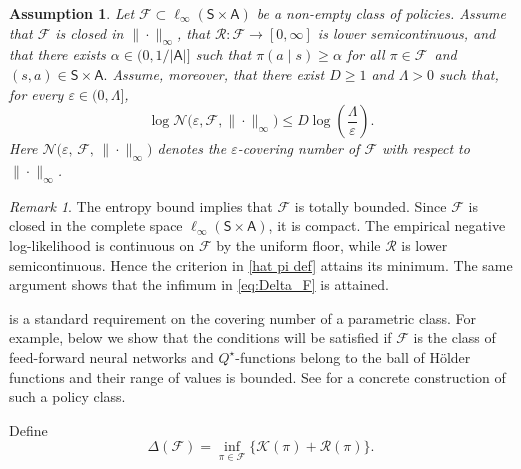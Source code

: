 \documentclass{article}
\theoremstyle{definition}
\theoremstyle{remark}
\newtheorem{remark}[proposition]{Remark}
\theoremstyle{plain}
\newtheorem{assumption}[proposition]{Assumption}
\numberwithin{equation}{section}
\begin{document}
\begin{assumption}
    \label{assum: F}
Let \(\mathcal F\subset \ell_\infty(\mathsf S\times\mathsf A)\) be a non-empty class of policies. Assume that \(\mathcal F\) is
closed in \(\|\cdot\|_\infty\), that
\(\mathcal R:\mathcal F\to[0,\infty]\) is lower semicontinuous, and that
there exists \(\alpha\in(0,1/|\mathsf A|]\) such that
\(
    \pi(a\mid s)\geq\alpha 
\) for all \(\pi\in\mathcal F\)\ and 
    \((s,a)\in\mathsf S\times\mathsf A.\)
Assume, moreover, that there exist \(D\geq1\) and \(\Lambda>0\) such that,
for every \(\varepsilon\in(0,\Lambda]\),
\begin{equation}
\label{eq:entropy-bound}
    \log\mathcal N
    \bigl(\varepsilon,\mathcal F,\|\cdot\|_\infty\bigr)
    \leq
    D\log\left(\frac{\Lambda}{\varepsilon}\right).
\end{equation}
Here \(\mathcal N\big(\varepsilon,\,\mathcal F,\,\|\cdot\|_\infty\big)\) denotes the $\varepsilon$-covering number of $\mathcal F$ with respect to
$\|\cdot\|_\infty$.
\end{assumption}
\begin{remark}
\label{rem:compact}
    The entropy bound implies that \(\mathcal F\) is totally bounded. Since
\(\mathcal F\) is closed in the complete space
\(\ell_\infty(\mathsf S\times\mathsf A)\), it is compact. The empirical
negative log-likelihood is continuous on \(\mathcal F\) by the uniform
floor, while \(\mathcal R\) is lower semicontinuous. Hence the criterion
in \eqref{hat pi def} attains its minimum. The same argument shows that
the infimum in \eqref{eq:Delta_F} is attained.
\end{remark}
  is a standard requirement on the covering number of a parametric class. For example, below we show that the conditions will be satisfied if $\mathcal F$ is the class of feed-forward neural networks and $Q^\star$-functions belong to the ball of Hölder functions and their range of values is bounded. See  for a concrete construction of such a policy class.

Define
\begin{equation}
\label{eq:Delta_F}
\Delta(\mathcal F)
=\inf_{\pi\in\mathcal F}\Big\{ \mathcal{K}(\pi)+\mathcal R(\pi)\Big\}.
\end{equation}
\end{document}
